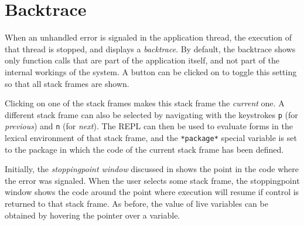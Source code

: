 \chapter{Backtrace}
\label{chap-backtrace}

When an unhandled error is signaled in the application thread, the
execution of that thread is stopped, and \sysname{} displays a
\emph{backtrace}.  By default, the backtrace shows only function calls
that are part of the application itself, and not part of the internal
workings of the \commonlisp{} system.  A button can be clicked on to
toggle this setting so that all stack frames are shown.

Clicking on one of the stack frames makes this stack frame the
\emph{current} one.  A different stack frame can also be selected by
navigating with the keystrokes \texttt{p} (for \emph{previous}) and
\texttt{n} (for \emph{next}).  The \sysname{} REPL can then be used to
evaluate forms in the lexical environment of that stack frame, and the
\texttt{*package*} special variable is set to the package in which the
code of the current stack frame has been defined.

Initially, the \emph{stoppingpoint{} window} discussed in
 shows the point in the code where
the error was signaled.  When the user selects some stack frame, the
stoppingpoint{} window shows the code around the point where execution
will resume if control is returned to that stack frame.  As before,
the value of live variables can be obtained by hovering the pointer
over a variable.
